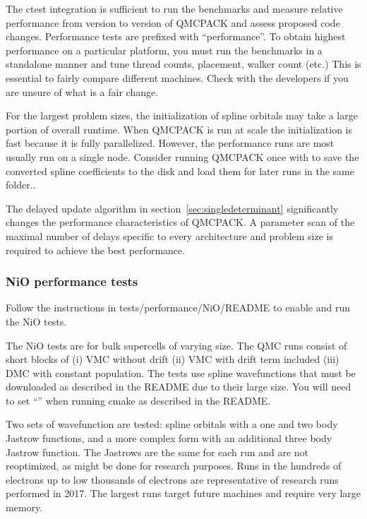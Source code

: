 The ctest integration is sufficient to run the benchmarks and measure
relative performance from version to version of QMCPACK and assess
proposed code changes. Performance tests are prefixed with
``performance''. To obtain highest performance on a particular
platform, you must run the benchmarks in a standalone manner and tune
thread counts, placement, walker count (etc.) This is essential to
fairly compare different machines. Check with the
developers if you are unsure of what is a fair change.

For the largest problem sizes, the initialization of spline orbitals may
take a large portion of overall runtime. When QMCPACK is run at scale
the initialization is fast because it is fully
parallelized. However, the performance runs are most usually run on a single node.
Consider running QMCPACK once with  to save the
converted spline coefficients to the disk and load them for later runs in the same folder..

The delayed update algorithm in section~\ref{sec:singledeterminant}
significantly changes the performance characteristics of QMCPACK.  A
parameter scan of the maximal number of delays specific to every
architecture and problem size is required to achieve the best
performance.

\subsubsection{NiO performance tests}

Follow the instructions in tests/performance/NiO/README to
enable and run the NiO tests.

The NiO tests are for bulk supercells of varying size. The QMC runs consist of short blocks of (i) VMC
without drift (ii) VMC with drift term included (iii) DMC with
constant population. The tests use spline wavefunctions that must be
downloaded as described in the README due to their large size. You
will need to set ``''
when running cmake as
described in the README.

Two sets of wavefunction are tested: spline orbitals with a one and
two body Jastrow functions, and a more complex form with an additional
three body Jastrow function. The Jastrows are the same for each run
and are not reoptimized, as might be done for research purposes.  Runs
in the hundreds of electrons up to low thousands of electrons are representative of
research runs performed in 2017. The largest runs target
future machines and require very large memory.

